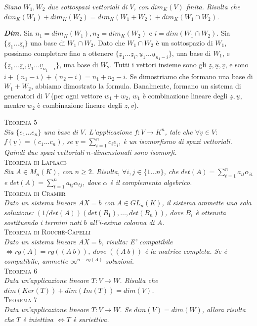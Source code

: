 \documentclass[a4paper,10pt]{article} %
\newcommand{\dimo}[1]{%
    \par \hfill\begin{minipage}{0.99\linewidth}{ \tiny {\textbf{\em{Dim.}}} {#1} }\end{minipage}}
\newcommand{\mtheorem}[1]{%
    {\hspace*{-10pt} \textsc {#1}}}
\renewcommand{\v}[1]{%
    {\underline{#1}}}
\begin{document}
    \emph{Siano $W_1, W_2$ due sottospazi vettoriali di $V$, con $dim_K(V)$ finita. Risulta che $dim_K(W_1) + dim_K(W_2) = dim_K(W_1 + W_2) + dim_K(W_1 \cap W_2)$.}
    \dimo{Sia $n_1 = dim_K(W_1), n_2 = dim_K(W_2)$ e $i = dim(W_1 \cap W_2)$. Sia $\{\v{z}_1 \ldots \v{z}_i\}$ una base di $W_1 \cap W_2$. Dato che $W_1 \cap W_2$ è un sottospazio di $W_1$, possiamo completare fino a ottenere $\{\v{z}_1 \ldots \v{z}_i, \v{u}_1 \ldots \v{u}_{n_1 - i} \}$, una base di $W_1$, e $\{\v{z}_1 \ldots \v{z}_i, \v{v}_1 \ldots \v{v}_{n_1 - i} \}$, una base di $W_2$. Tutti i vettori insieme sono gli $\v{z}, \v{u}, \v{v}$, e sono $i + (n_1 - i) + (n_2 - i) = n_1 + n_2 - i$. Se dimostriamo che formano una base di $W_1 + W_2$, abbiamo dimostrato la formula. Banalmente, formano un sistema di generatori di $V$ (per ogni vettore $w_1 + w_2$, $w_1$ è combinazione lineare degli $\v{z}, \v{u}$, mentre $w_2$ è combinazione lineare degli $\v{z}, \v{v}$). 
    }
\mtheorem{Teorema 5}\\
    \emph{Sia $\{ e_1 \ldots e_n\}$ una base di $V$. L'applicazione $f : V \rightarrow K^n$, tale che $\forall \v{v} \in V:$ $f(\v{v}) = (c_1 \ldots c_n)$, se $\v{v} = \sum_{i=1}^n c_i\v{e}_i$, è un isomorfismo di spazi vettoriali. Quindi due spazi vettoriali $n$-dimensionali sono isomorfi.}\\
\mtheorem{Teorema di Laplace}\\
    \emph{Sia $A \in M_n(K)$, con $n \geq 2$. Risulta, $\forall i, j \in \{ 1 \ldots n \}$, che $det(A) = \sum_{t=1}^n a_{it} \alpha_{it}$ e $det(A) = \sum_{t=1}^n a_{tj} \alpha_{tj}$, dove $\alpha$ è il complemento algebrico.}\\
\mtheorem{Teorema di Cramer}\\
    \emph{Dato un sistema lineare $AX = b$ con $A\in GL_n(K)$, il sistema ammette una sola soluzione: $(1/det(A)) (det(B_1), \ldots, det(B_n))$, dove $B_i$ è ottenuta sostituendo i termini noti $b$ all'i-esima colonna di $A$.}\\
\mtheorem{Teorema di Rouchè-Capelli}\\
    \emph{Dato un sistema lineare $AX = b$, risulta: E' compatibile $\Leftrightarrow rg(A) = rg((A\ b))$, dove $((A\ b))$ è la matrice completa. Se è compatibile, ammette $\infty^{n - rg(A)}$ soluzioni.}\\
\mtheorem{Teorema 6}\\
    \emph{Data un'applicazione lineare $T : V \rightarrow W$. Risulta che $dim(Ker(T)) + dim(Im(T)) = dim(V)$.}\\
\mtheorem{Teorema 7}\\
    \emph{Data un'applicazione lineare $T : V \rightarrow W$. Se $dim(V) = dim(W)$, allora risulta che $T$ è iniettiva $\Leftrightarrow T$ è suriettiva.}\\
\end{document}
